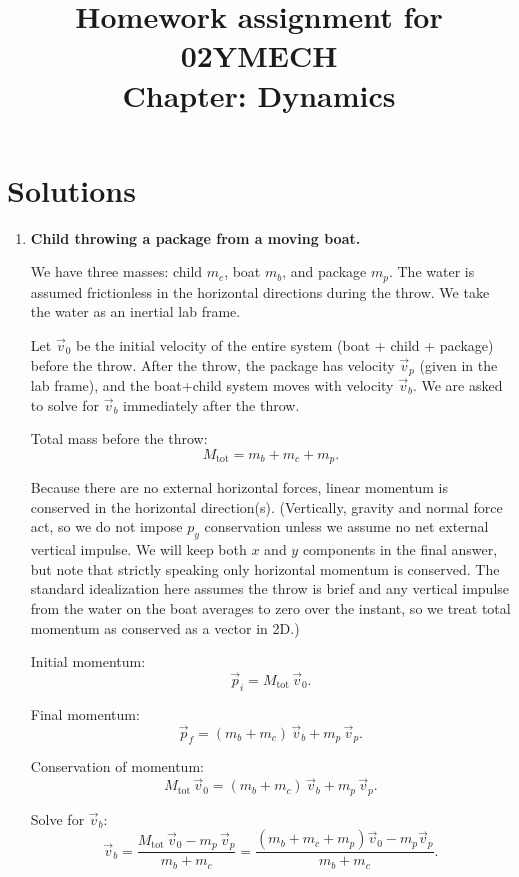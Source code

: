 \documentclass[12pt]{article}
\title{Homework assignment for 02YMECH \\ Chapter: Dynamics}
\date{}
\begin{document}
\maketitle

\vspace*{-2cm}

\section*{Solutions}

\begin{enumerate}

\item \textbf{Child throwing a package from a moving boat.}

We have three masses: child $m_c$, boat $m_b$, and package $m_p$. The water is assumed frictionless in the horizontal directions during the throw. We take the water as an inertial lab frame.

Let $\vec{v}_0$ be the initial velocity of the entire system (boat + child + package) before the throw. After the throw, the package has velocity $\vec{v}_p$ (given in the lab frame), and the boat+child system moves with velocity $\vec{v}_b$. We are asked to solve for $\vec{v}_b$ immediately after the throw.

Total mass before the throw:
\[
M_{\text{tot}} = m_b + m_c + m_p.
\]

Because there are no external horizontal forces, linear momentum is conserved in the horizontal direction(s). (Vertically, gravity and normal force act, so we do not impose $p_y$ conservation unless we assume no net external vertical impulse. We will keep both $x$ and $y$ components in the final answer, but note that strictly speaking only horizontal momentum is conserved. The standard idealization here assumes the throw is brief and any vertical impulse from the water on the boat averages to zero over the instant, so we treat total momentum as conserved as a vector in 2D.)

Initial momentum:
\[
\vec{p}_i = M_{\text{tot}} \, \vec{v}_0.
\]

Final momentum:
\[
\vec{p}_f = (m_b + m_c)\, \vec{v}_b + m_p \, \vec{v}_p.
\]

Conservation of momentum:
\[
M_{\text{tot}} \, \vec{v}_0 = (m_b + m_c)\, \vec{v}_b + m_p \, \vec{v}_p.
\]

Solve for $\vec{v}_b$:
\[
\vec{v}_b
= \frac{M_{\text{tot}} \, \vec{v}_0 - m_p \, \vec{v}_p}{m_b + m_c}
= \frac{(m_b + m_c + m_p)\vec{v}_0 - m_p \vec{v}_p}{m_b + m_c}.
\]


\end{enumerate}
\end{document}
